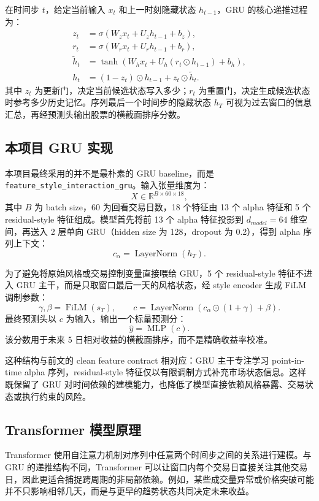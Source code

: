 \documentclass[12pt,a4paper,cn,bibtex]{elegantpaper}
\newcommand{\modelname}[1]{\nolinkurl{#1}}
\begin{document}
在时间步 $t$，给定当前输入 $x_t$ 和上一时刻隐藏状态 $h_{t-1}$，GRU 的核心递推过程为：
\begin{align}
    z_t &= \sigma(W_z x_t + U_z h_{t-1} + b_z), \\
    r_t &= \sigma(W_r x_t + U_r h_{t-1} + b_r), \\
    \tilde{h}_t &= \tanh(W_h x_t + U_h(r_t \odot h_{t-1}) + b_h), \\
    h_t &= (1-z_t) \odot h_{t-1} + z_t \odot \tilde{h}_t.
\end{align}
其中 $z_t$ 为更新门，决定当前候选状态写入多少；$r_t$ 为重置门，决定生成候选状态时参考多少历史记忆。序列最后一个时间步的隐藏状态 $h_T$ 可视为过去窗口的信息汇总，再经预测头输出股票的横截面排序分数。

\subsection{本项目 GRU 实现}

本项目最终采用的并不是最朴素的 GRU baseline，而是 \modelname{feature\_style\_interaction\_gru}。输入张量维度为：
\[
    X \in \mathbb{R}^{B \times 60 \times 18},
\]
其中 $B$ 为 batch size，60 为回看交易日数，18 个特征由 13 个 alpha 特征和 5 个 residual-style 特征组成。模型首先将前 13 个 alpha 特征投影到 $d_{model}=64$ 维空间，再送入 2 层单向 GRU（hidden size 为 128，dropout 为 0.2），得到 alpha 序列上下文：
\[
    c_{\alpha} = \operatorname{LayerNorm}(h_T).
\]

为了避免将原始风格或交易控制变量直接喂给 GRU，5 个 residual-style 特征不进入 GRU 主干，而是只取窗口最后一天的风格状态，经 style encoder 生成 FiLM 调制参数：
\[
    \gamma, \beta = \operatorname{FiLM}(s_T),
    \qquad
    c = \operatorname{LayerNorm}\left(c_{\alpha} \odot (1+\gamma) + \beta\right).
\]
最终预测头以 $c$ 为输入，输出一个标量预测分：
\[
    \hat{y} = \operatorname{MLP}(c).
\]
该分数用于未来 5 日相对收益的横截面排序，而不是精确收益率校准。

这种结构与前文的 clean feature contract 相对应：GRU 主干专注学习 point-in-time alpha 序列，residual-style 特征仅以有限调制方式补充市场状态信息。这样既保留了 GRU 对时间依赖的建模能力，也降低了模型直接依赖风格暴露、交易状态或执行约束的风险。

\subsection{Transformer 模型原理}
Transformer 使用自注意力机制对序列中任意两个时间步之间的关系进行建模。与 GRU 的递推结构不同，Transformer 可以让窗口内每个交易日直接关注其他交易日，因此更适合捕捉跨周期的非局部依赖。例如，某些成交量异常或价格突破可能并不只影响相邻几天，而是与更早的趋势状态共同决定未来收益。
\end{document}
